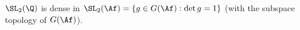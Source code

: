 $\SL_2(\Q)$ is dense in $\SL_2(\Af)=\{g\in G(\Af):\det g=1\}$ (with the subspace topology of $G(\Af)$).
